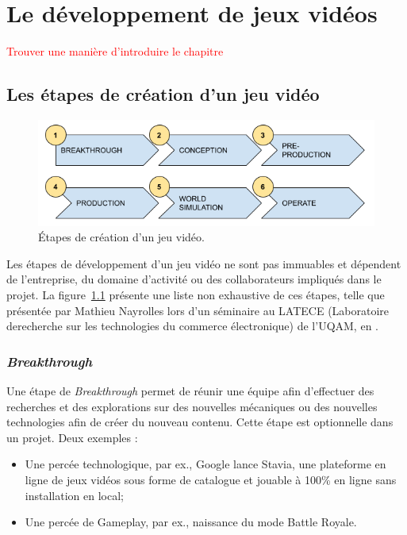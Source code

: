 \chapter{Le développement de jeux vidéos}
 \textcolor{red}{Trouver une manière d'introduire le chapitre}

\section{Les étapes de création d'un jeu vid\'eo}
\begin{figure}[H]
    \centering
    \includegraphics[width=14cm]{10_img/production_stages.png} 
    \caption{Étapes de création d'un jeu vidéo.}
    \label{etapes.fig}
\end{figure}





Les étapes de développement d'un jeu vidéo ne sont pas immuables et dépendent de l'entreprise, du domaine d'activité ou des collaborateurs impliqués dans le projet. La figure~\ref{etapes.fig} pr\'esente une liste non exhaustive de ces \'etapes, telle que présentée par Mathieu Nayrolles lors d’un séminaire au LATECE (Laboratoire derecherche sur les technologies du commerce électronique) de l’UQAM, en .



\subsection{\emph{Breakthrough}}



Une étape de \emph{Breakthrough} permet de réunir une équipe afin d'effectuer des recherches et des explorations sur des nouvelles mécaniques ou des nouvelles technologies afin de créer du nouveau contenu. Cette étape est optionnelle dans un projet.
Deux exemples :
\begin{itemize}
    \item Une percée technologique, par ex., Google lance Stavia, une plateforme en ligne de jeux vidéos sous forme de catalogue et jouable à 100\% en ligne sans installation en local;
    \item Une percée de Gameplay, par ex., naissance du mode Battle Royale.
\end{itemize}

